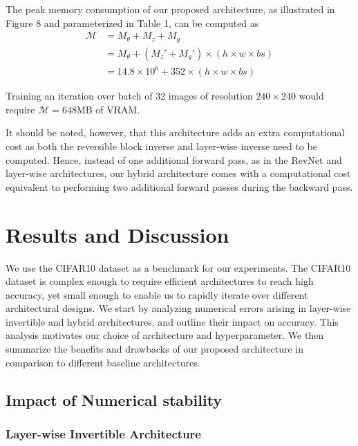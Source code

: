 \documentclass[twocolumn]{bmcart}
\begin{document}
The peak memory consumption of our proposed architecture, as illustrated in Figure 8 and parameterized in Table 1, can be computed as  
\begin{subequations}
\begin{align}
\mathcal{M} &= M_{\theta} + M_{z} + M_{g} \\
            &= M_{\theta} + (M_z' + M_{g}') \times (h \times w \times bs) \\
            &= 14.8 \times 10^6 + 352 \times (h \times w \times bs) 
\end{align}
\end{subequations}

Training an iteration over batch of 32 images of resolution $240 \times 240$ would require $\mathcal{M}=648$MB of VRAM.

It should be noted, however, that this architecture adds an extra computational cost as both the reversible block inverse and layer-wise inverse need to be computed.
Hence, instead of one additional forward pass, as in the RevNet and layer-wise architectures,
our hybrid architecture comes with a computational cost equivalent to performing two additional forward passes
during the backward pass. 

\section{Results and Discussion}

We use the CIFAR10 dataset as a benchmark for our experiments.
The CIFAR10 dataset is complex enough to require efficient architectures to reach high accuracy, 
yet small enough to enable us to rapidly iterate over different architectural designs.
We start by analyzing numerical errors arising in layer-wise invertible and hybrid architectures, 
and outline their impact on accuracy.
This analysis motivates our choice of architecture and hyperparameter.
We then summarize the benefits and drawbacks of our proposed architecture in comparison to different baseline architectures.

\subsection{Impact of Numerical stability}

\subsubsection{Layer-wise Invertible Architecture}
\end{document}
